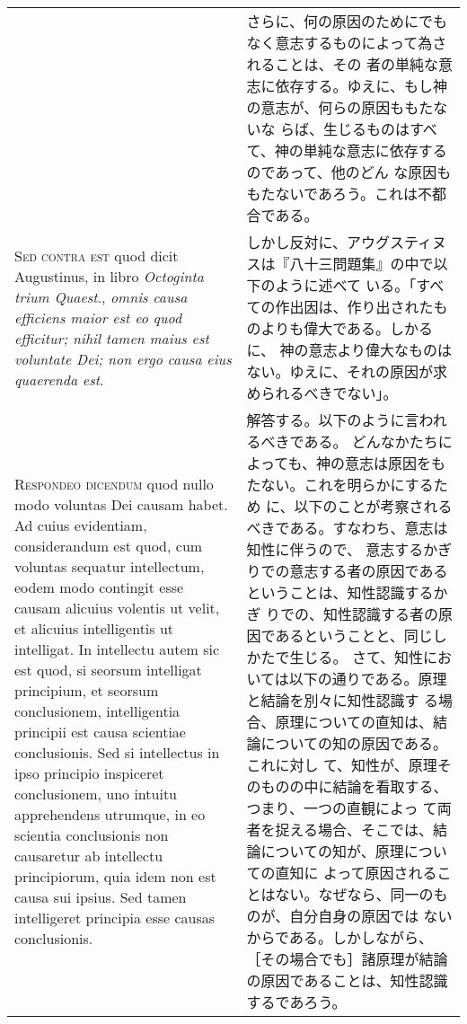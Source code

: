 \documentclass[10pt]{jsarticle} %
\begin{document}
\begin{longtable}{p{21em}p{21em}}
&

さらに、何の原因のためにでもなく意志するものによって為されることは、その
者の単純な意志に依存する。ゆえに、もし神の意志が、何らの原因ももたないな
 らば、生じるものはすべて、神の単純な意志に依存するのであって、他のどん
 な原因ももたないであろう。これは不都合である。


\\


{\scshape  Sed contra est} quod dicit Augustinus, in
libro {\itshape Octoginta trium Quaest}., {\itshape omnis causa efficiens maior est eo quod
efficitur; nihil tamen maius est voluntate Dei; non ergo causa eius
quaerenda est}.


&

しかし反対に、アウグスティヌスは『八十三問題集』の中で以下のように述べて
 いる。「すべての作出因は、作り出されたものよりも偉大である。しかるに、
 神の意志より偉大なものはない。ゆえに、それの原因が求められるべきでない」。



\\


{\scshape Respondeo dicendum} quod nullo modo voluntas
Dei causam habet. Ad cuius evidentiam, considerandum est quod, cum
voluntas sequatur intellectum, eodem modo contingit esse causam alicuius
volentis ut velit, et alicuius intelligentis ut intelligat. In
intellectu autem sic est quod, si seorsum intelligat principium, et
seorsum conclusionem, intelligentia principii est causa scientiae
conclusionis. Sed si intellectus in ipso principio inspiceret
conclusionem, uno intuitu apprehendens utrumque, in eo scientia
conclusionis non causaretur ab intellectu principiorum, quia idem non
est causa sui ipsius. Sed tamen intelligeret principia esse causas
conclusionis. 


&

解答する。以下のように言われるべきである。
どんなかたちによっても、神の意志は原因をもたない。これを明らかにするため
 に、以下のことが考察されるべきである。すなわち、意志は知性に伴うので、
 意志するかぎりでの意志する者の原因であるということは、知性認識するかぎ
 りでの、知性認識する者の原因であるということと、同じしかたで生じる。
さて、知性においては以下の通りである。原理と結論を別々に知性認識す
 る場合、原理についての直知は、結論についての知の原因である。これに対し
 て、知性が、原理そのものの中に結論を看取する、つまり、一つの直観によっ
 て両者を捉える場合、そこでは、結論についての知が、原理についての直知に
 よって原因されることはない。なぜなら、同一のものが、自分自身の原因では
 ないからである。しかしながら、［その場合でも］諸原理が結論の原因であることは、知性認識
 するであろう。


\end{longtable}
\end{document}
